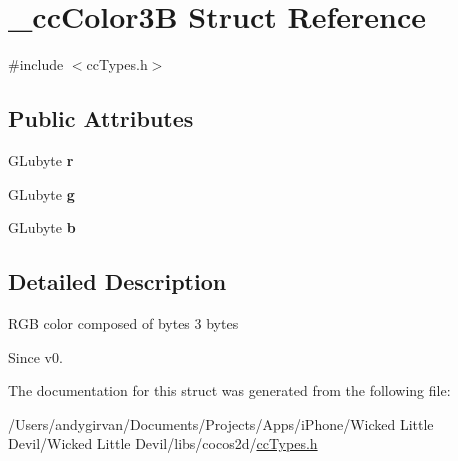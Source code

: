 \hypertarget{struct__cc_color3_b}{\section{\-\_\-cc\-Color3\-B Struct Reference}
\label{struct__cc_color3_b}
}


{\ttfamily \#include $<$cc\-Types.\-h$>$}

\subsection*{Public Attributes}
\begin{DoxyCompactItemize}
\item 
\hypertarget{struct__cc_color3_b_abda5d10f09d1e61b9b6bfeaf87f99f60}{G\-Lubyte {\bfseries r}}\label{struct__cc_color3_b_abda5d10f09d1e61b9b6bfeaf87f99f60}

\item 
\hypertarget{struct__cc_color3_b_a37dfac6d3bfb3eed1c76a8fef8cdee31}{G\-Lubyte {\bfseries g}}\label{struct__cc_color3_b_a37dfac6d3bfb3eed1c76a8fef8cdee31}

\item 
\hypertarget{struct__cc_color3_b_a3a73af521a35f507dd34b169112c6fe4}{G\-Lubyte {\bfseries b}}\label{struct__cc_color3_b_a3a73af521a35f507dd34b169112c6fe4}

\end{DoxyCompactItemize}


\subsection{Detailed Description}
\begin{DoxyVerb}RGB color composed of bytes 3 bytes
\end{DoxyVerb}
 \begin{DoxySince}{Since}
v0. 
\end{DoxySince}


The documentation for this struct was generated from the following file\-:\begin{DoxyCompactItemize}
\item 
/\-Users/andygirvan/\-Documents/\-Projects/\-Apps/i\-Phone/\-Wicked Little Devil/\-Wicked Little Devil/libs/cocos2d/\hyperlink{cc_types_8h}{cc\-Types.\-h}\end{DoxyCompactItemize}
